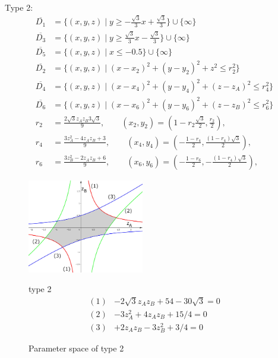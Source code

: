 \documentclass[suppldata, dvipdfmx]{interact}
\theoremstyle{plain}%
\theoremstyle{definition}
\theoremstyle{remark}
\theoremstyle{problemstyle}
\begin{document}
\bigskip\par
Type 2:%
\begin{align*}
\overline{D_1}&=\{(x,y,z) \mid y \ge -\frac{\sqrt{3}}{3}x + \frac{\sqrt{3}}{3}\} \cup \{ \infty \}\\
\overline{D_3}&=\{(x,y,z) \mid y \ge \frac{\sqrt{3}}{3}x - \frac{\sqrt{3}}{3} \} \cup\{\infty\}\\
\overline{D_5}&=\{(x,y,z) \mid x \le -0.5 \} \cup\{\infty\}\\
\overline{D_2}&=\{(x,y,z) \mid (x-x_2)^2+(y-y_2)^2+z^2 \le r_2^2 \} \\
\overline{D_4}&=\{(x,y,z) \mid (x-x_4)^2+(y-y_4)^2+(z-z_A)^2 \le r_4^2 \} \\
\overline{D_6}&=\{(x,y,z) \mid (x-x_6)^2+(y-y_6)^2+(z-z_B)^2 \le r_6^2 \} \\
 r_2 &= \frac{2\sqrt{3}z_Az_B 3\sqrt{3}}{9},  \qquad
(x_2, y_2) = \left(1-r_2\frac{\sqrt{3}}{2}, \frac{r_2}{2}\right),\\
 r_4 &= \frac{3z_A^2 - 4z_Az_B + 3}{9}, \qquad
 (x_4, y_4) = \left(-\frac{1 - r_4}{2}, \frac{(1 - r_4)\sqrt{3}}{2}\right),\\
 r_6 &= \frac{3z_B^2 -2z_Az_B + 6}{9}, \qquad
(x_6, y_6) = \left(-\frac{1 - r_6}{2}, -\frac{(1 - r_4)\sqrt{3}}{2}\right),
\end{align*} 
\begin{figure}[h]
 \begin{minipage}[]{0.5\textwidth}
 \centering
 \includegraphics[width=2in,
 keepaspectratio]{./img/graph/cubeB.jpg}
 \caption{Parameter space of type 2}
 \label{fig:graphCubeB}
 \end{minipage}
 \hspace*{\fill}
 \begin{minipage}[]{0.5\textwidth}
  type 2
  \centering
  \begin{align*}
   (1)& -2\sqrt{3} z_A z_B + 54 - 30\sqrt{3} = 0\\
   (2)& -3z_A^2 + 4 z_A z_B + 15/4 = 0\\
   (3)& +2z_A z_B - 3z_B^2 + 3/4 = 0
  \end{align*}
 \end{minipage}
\end{figure}
\end{document}
